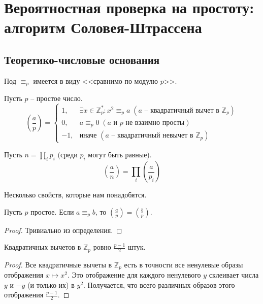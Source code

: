 \newcommand{\divisible}{\mathop{\raisebox{-2pt}{\vdots}}}
\section{Вероятностная проверка на простоту: алгоритм Соловея-Штрассена}

\secauthor{\ivan, \denis}

\subsection{Теоретико-числовые основания}
Под $\equiv_p$ имеется в виду <<сравнимо по модулю $p$>>.
\begin{definition*} Пусть $p$ -- простое число.
$$\left(\frac{a}{p}\right) = \begin{cases}
1,  & \exists x\in\mathbb{Z}_p^*: x^2\equiv_p a \; (a \text{~-- квадратичный вычет в } \mathbb Z_p)\\
0,  & a\equiv_p0 \; (a \text{ и } p \text{ не взаимно просты})\\
-1, & \text{иначе } (a \text{~-- квадратичный невычет в } \mathbb Z_p)
\end{cases}$$
\end{definition*}

\begin{definition*} Пусть $n = \prod_i p_i$ (среди $p_i$ могут быть равные).
$$\left(\frac{a}{n}\right)=\prod_i \left(\frac{a}{p_i}\right)$$
\end{definition*}

Несколько свойств, которые нам понадобятся.

\begin{lemma} \hypertarget{aequivb}{}
Пусть $p$ простое. Если $a \equiv_p b$, то $\left(\frac{a}{p}\right) = \left(\frac{b}{p}\right)$.
\end{lemma}
\begin{proof}
Тривиально из определения.
\end{proof}

\begin{lemma}\label{qresiduelemma} Квадратичных вычетов в $\mathbb Z_p$ ровно $\frac{p-1}{2}$ штук.
\end{lemma}
\begin{proof}
Все квадратичные вычеты в $\mathbb Z_p$ есть в точности все ненулевые образы отображения $x \mapsto x^2$. Это отображение для каждого ненулевого $y$ склеивает числа $y$ и $-y$ (и только их) в $y^2$. Получается, что всего различных образов этого отображения $\frac{p-1}{2}$.
\end{proof}

